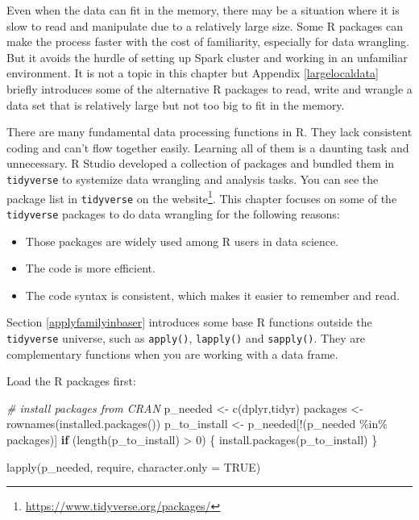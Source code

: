 \documentclass[
  12pt,
]{krantz}
\makeatletter
\newenvironment{Shaded}{\begin{snugshade}}{\end{snugshade}}
\newcommand{\AttributeTok}[1]{\textcolor[rgb]{0.61,0.61,0.61}{#1}}
\newcommand{\CommentTok}[1]{\textcolor[rgb]{0.37,0.37,0.37}{\textit{#1}}}
\newcommand{\ConstantTok}[1]{\textcolor[rgb]{0,0,0}{#1}}
\newcommand{\ControlFlowTok}[1]{\textcolor[rgb]{0.27,0.27,0.27}{\textbf{#1}}}
\newcommand{\DecValTok}[1]{\textcolor[rgb]{0.06,0.06,0.06}{#1}}
\newcommand{\FunctionTok}[1]{\textcolor[rgb]{0,0,0}{#1}}
\newcommand{\NormalTok}[1]{#1}
\newcommand{\OtherTok}[1]{\textcolor[rgb]{0.37,0.37,0.37}{#1}}
\newcommand{\SpecialCharTok}[1]{\textcolor[rgb]{0,0,0}{#1}}
\newcommand{\StringTok}[1]{\textcolor[rgb]{0.5,0.5,0.5}{#1}}
\providecommand{\tightlist}{%
  \setlength{\itemsep}{0pt}\setlength{\parskip}{0pt}}
\renewcommand{\href}[2]{#2\footnote{\url{#1}}}
\newenvironment{kframe}{%
\medskip{}
\setlength{\fboxsep}{.8em}
 \def\at@end@of@kframe{}%
 \ifinner\ifhmode%
  \def\at@end@of@kframe{\end{minipage}}%
  \begin{minipage}{\columnwidth}%
 \fi\fi%
 \def\FrameCommand##1{\hskip\@totalleftmargin \hskip-\fboxsep
 \colorbox{shadecolor}{##1}\hskip-\fboxsep
     \hskip-\linewidth \hskip-\@totalleftmargin \hskip\columnwidth}%
 \MakeFramed {\advance\hsize-\width
   \@totalleftmargin\z@ \linewidth\hsize
   \@setminipage}}%
 {\par\unskip\endMakeFramed%
 \at@end@of@kframe}
\renewenvironment{Shaded}{\begin{kframe}}{\end{kframe}}
\makeatother
\begin{document}
Even when the data can fit in the memory, there may be a situation where it is slow to read and manipulate due to a relatively large size. Some R packages can make the process faster with the cost of familiarity, especially for data wrangling. But it avoids the hurdle of setting up Spark cluster and working in an unfamiliar environment. It is not a topic in this chapter but Appendix \ref{largelocaldata} briefly introduces some of the alternative R packages to read, write and wrangle a data set that is relatively large but not too big to fit in the memory.

There are many fundamental data processing functions in R. They lack consistent coding and can't flow together easily. Learning all of them is a daunting task and unnecessary. R Studio developed a collection of packages and bundled them in \texttt{tidyverse} to systemize data wrangling and analysis tasks. You can see the package list in \texttt{tidyverse} on the \href{https://www.tidyverse.org/packages/}{website}. This chapter focuses on some of the \texttt{tidyverse} packages to do data wrangling for the following reasons:

\begin{itemize}
\tightlist
\item
  Those packages are widely used among R users in data science.
\item
  The code is more efficient.
\item
  The code syntax is consistent, which makes it easier to remember and read.
\end{itemize}

Section \ref{applyfamilyinbaser} introduces some base R functions outside the \texttt{tidyverse} universe, such as \texttt{apply()}, \texttt{lapply()} and \texttt{sapply()}. They are complementary functions when you are working with a data frame.

Load the R packages first:

\begin{Shaded}
\begin{Highlighting}[]
\CommentTok{\# install packages from CRAN}
\NormalTok{p\_needed }\OtherTok{\textless{}{-}} \FunctionTok{c}\NormalTok{(}\StringTok{\textquotesingle{}dplyr\textquotesingle{}}\NormalTok{,}\StringTok{\textquotesingle{}tidyr\textquotesingle{}}\NormalTok{)}
\NormalTok{packages }\OtherTok{\textless{}{-}} \FunctionTok{rownames}\NormalTok{(}\FunctionTok{installed.packages}\NormalTok{())}
\NormalTok{p\_to\_install }\OtherTok{\textless{}{-}}\NormalTok{ p\_needed[}\SpecialCharTok{!}\NormalTok{(p\_needed }\SpecialCharTok{\%in\%}\NormalTok{ packages)]}
\ControlFlowTok{if}\NormalTok{ (}\FunctionTok{length}\NormalTok{(p\_to\_install) }\SpecialCharTok{\textgreater{}} \DecValTok{0}\NormalTok{) \{}
    \FunctionTok{install.packages}\NormalTok{(p\_to\_install)}
\NormalTok{\}}

\FunctionTok{lapply}\NormalTok{(p\_needed, require, }\AttributeTok{character.only =} \ConstantTok{TRUE}\NormalTok{)}
\end{Highlighting}
\end{Shaded}
\end{document}
